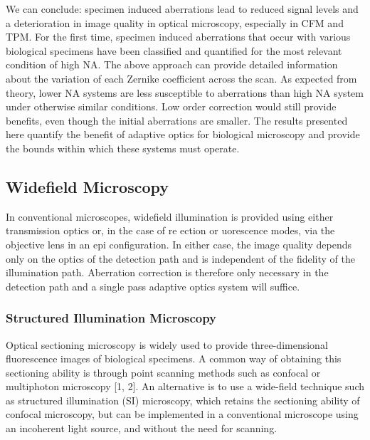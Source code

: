 We can conclude: specimen induced aberrations lead to reduced signal levels 
and a deterioration in image quality in optical microscopy, especially in CFM 
and TPM. For the first time, specimen induced aberrations that occur with 
various biological specimens have been classified and quantified for the most 
relevant condition of high NA. The above approach can provide detailed 
information about the variation of each Zernike coefficient across the scan.
As expected from theory, lower NA systems are less susceptible to aberrations 
than high NA system under otherwise similar conditions. Low order correction 
would still provide benefits, even though the initial aberrations are 
smaller. The results presented here quantify the benefit of adaptive optics 
for biological microscopy and provide the bounds within which these systems 
must operate.
\cite{characterizing_abberations}

\subsection{Widefield Microscopy}
\label{sec:WidefieldMicroscopy}

In conventional microscopes, widefield illumination is provided using either 
transmission optics or, in the case of re ection or uorescence modes, via the 
objective lens in an epi configuration. In either case, the image quality 
depends only on the optics of the detection path and is independent of the 
fidelity of the illumination path.
Aberration correction is therefore only necessary in the detection path and a 
single pass adaptive optics system will suffice.
\cite{Aberrations_book} 

\subsubsection{Structured Illumination Microscopy}
\label{sec:StructuredIlluminationMicroscopy}

\cite{wide_AOM_structured_illu}

Optical sectioning microscopy is widely used to provide three-dimensional 
fluorescence images of biological specimens. A common way of obtaining this 
sectioning ability is through point scanning methods such as confocal or 
multiphoton microscopy [1, 2]. An alternative is to use a wide-field 
technique such as structured illumination (SI) microscopy, which retains the 
sectioning ability of confocal microscopy, but can be implemented in a 
conventional microscope using an incoherent light source, and without the 
need for scanning. 

